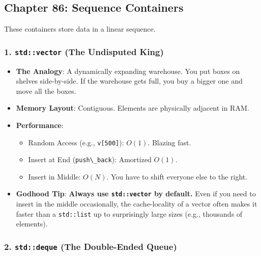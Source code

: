 \hypertarget{chapter-86-sequence-containers}{%
\subsection{Chapter 86: Sequence
Containers}\label{chapter-86-sequence-containers}}

These containers store data in a linear sequence.

\hypertarget{stdvector-the-undisputed-king}{%
\subsubsection{\texorpdfstring{1. \texttt{std::vector} (The Undisputed
King)}{1. std::vector (The Undisputed King)}}\label{stdvector-the-undisputed-king}}

\begin{itemize}
\tightlist
\item
  \textbf{The Analogy}: A dynamically expanding warehouse. You put boxes
  on shelves side-by-side. If the warehouse gets full, you buy a bigger
  one and move all the boxes.
\item
  \textbf{Memory Layout}: Contiguous. Elements are physically adjacent
  in RAM.
\item
  \textbf{Performance}:

  \begin{itemize}
  \tightlist
  \item
    Random Access (e.g., \passthrough{\lstinline!v[500]!}): \(O(1)\).
    Blazing fast.
  \item
    Insert at End (\passthrough{\lstinline!push\_back!}): Amortized
    \(O(1)\).
  \item
    Insert in Middle: \(O(N)\). You have to shift everyone else to the
    right.
  \end{itemize}
\item
  \textbf{Godhood Tip}: \textbf{Always use
  \passthrough{\lstinline!std::vector!} by default.} Even if you need to
  insert in the middle occasionally, the cache-locality of a vector
  often makes it faster than a \passthrough{\lstinline!std::list!} up to
  surprisingly large sizes (e.g., thousands of elements).
\end{itemize}

\hypertarget{stddeque-the-double-ended-queue}{%
\subsubsection{\texorpdfstring{2. \texttt{std::deque} (The Double-Ended
Queue)}{2. std::deque (The Double-Ended Queue)}}\label{stddeque-the-double-ended-queue}}

